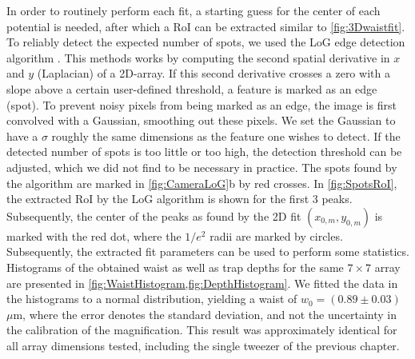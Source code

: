 In order to routinely perform each fit, a starting guess for the center of each potential is needed, after which a \ac{RoI} can be extracted similar to \cref{fig:3Dwaistfit}.
To reliably detect the expected number of spots, we used the \ac{LoG} edge detection algorithm \cite{Haralick1992}. 
This methods works by computing the second spatial derivative in $x$ and $y$ (Laplacian) of a 2D-array. 
If this second derivative crosses a zero with a slope above a certain user-defined threshold, a feature is marked as an edge (spot).
To prevent noisy pixels from being marked as an edge, the image is first convolved with a Gaussian, smoothing out these pixels. 
We set the Gaussian to have a $\sigma$ roughly the same dimensions as the feature one wishes to detect. 
If the detected number of spots is too little or too high, the detection threshold can be adjusted, which we did not find to be necessary in practice. 
The spots found by the algorithm are marked in \ref{fig:CameraLoG}b by red crosses. 
In \cref{fig:SpotsRoI}, the extracted \ac{RoI} by the \ac{LoG} algorithm is shown for the first 3 peaks. 
Subsequently, the center of the peaks as found by the 2D fit $(x_{0,m},y_{0,m})$ is marked with the red dot, where the $1/e^2$ radii are marked by circles. 
Subsequently, the extracted fit parameters can be used to perform some statistics.
Histograms of the obtained waist as well as trap depths for the same $7\times7$ array are presented in \cref{fig:WaistHistogram,fig:DepthHistogram}.
We fitted the data in the histograms to a normal distribution, yielding a waist of $w_0 = (0.89 \pm 0.03)$ $\mu$m, where the error denotes the standard deviation, and not the uncertainty in the calibration of the magnification. 
This result was approximately identical for all array dimensions tested, including the single tweezer of the previous chapter. 

